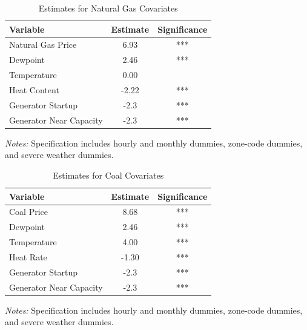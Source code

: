 \documentclass[12pt]{article}
\begin{document}
\begin{table}[htbp]
\centering
\caption{Estimates for Natural Gas Covariates}
\label{tab:ng_covariates}
\begin{tabular}{lcc}
\toprule
\textbf{Variable} & \textbf{Estimate} & \textbf{Significance} \\
\midrule
Natural Gas Price & 6.93 & *** \\
Dewpoint               & 2.46 & *** \\
Temperature            & 0.00 &     \\
Heat Content              & -2.22& *** \\
Generator Startup              & -2.3& *** \\
 Generator Near Capacity             & -2.3& *** \\
\bottomrule
\end{tabular}
\vspace{0.5em}

\footnotesize\textit{Notes:} Specification includes hourly and monthly dummies, zone-code dummies, and severe weather dummies.
\end{table}
\label{NaturalGasTable}

\begin{table}[htbp]
\centering
\caption{Estimates for Coal Covariates}
\label{tab:coal_covariates}
\begin{tabular}{lcc}
\toprule
\textbf{Variable} & \textbf{Estimate} & \textbf{Significance} \\
\midrule
Coal Price     & 8.68  & *** \\
Dewpoint       & 2.46  & *** \\
Temperature    & 4.00  & *** \\
Heat Rate      & -1.30 & *** \\
Generator Startup              & -2.3& *** \\
 Generator Near Capacity             & -2.3& *** \\
\bottomrule
\end{tabular}
\vspace{0.5em}

\footnotesize\textit{Notes:} Specification includes hourly and monthly dummies, zone-code dummies, and severe weather dummies.
\label{CoalTable}
\end{table}
\end{document}

